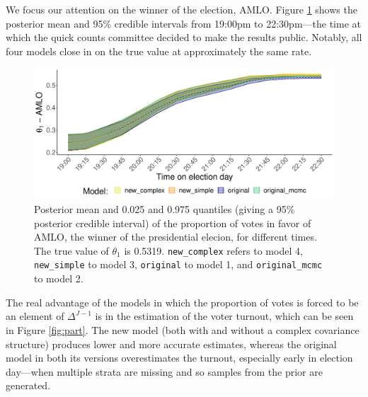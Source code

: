 \documentclass{article}
\begin{document}
We focus our attention on the winner of the election, AMLO. Figure \ref{fig:amlo} shows the posterior mean and 95\% credible intervals from 19:00pm to 22:30pm---the time at which the quick counts committee decided to make the results public. Notably, all four models close in on the true value at approximately the same rate. \\


\begin{figure}[h]
  \centering
  \includegraphics[width=\textwidth]{../fig/amlo2.pdf}
  \caption{Posterior mean and 0.025 and 0.975 quantiles (giving a 95\% posterior credible interval) of the proportion of votes in favor of AMLO, the winner of the presidential elecion, for different times. The true value of $\theta_1$ is 0.5319. \texttt{new\_complex} refers to model 4, \texttt{new\_simple} to model 3, \texttt{original} to model 1, and \texttt{original\_mcmc} to model 2.}
  \label{fig:amlo}
\end{figure}




The real advantage of the models in which the proportion of votes is forced to be an element of $\Delta^{J-1}$ is in the estimation of the voter turnout, which can be seen in Figure \ref{fig:part}. The new model (both with and without a complex covariance structure) produces lower and more accurate estimates, whereas the original model in both its versions overestimates the turnout, especially early in election day---when multiple strata are missing and so samples from the prior are generated. \\
\end{document}
